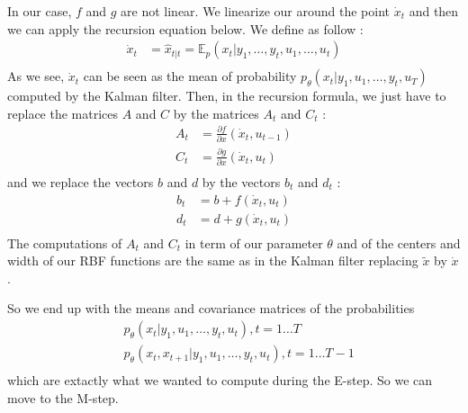 In our case, $f$ and $g$ are not linear.
We linearize our around the point $\dot{x}_t$ and then we can apply the recursion equation below.
We define  as follow :
\begin{align*}
  \dot{x}_t &= \hat{x}_{t|t} = \mathbb{E}_p(x_t|y_1, \ldots , y_t, u_1, \ldots , u_t) \\
\end{align*}
As we see, $\dot{x}_t$ can be seen as the mean of probability  $p_{\theta}\left(x_t|y_1, u_1, \ldots, y_t, u_T \right )$ computed by the Kalman filter.
Then, in the recursion formula, we just have to replace the matrices $A$ and $C$  by the matrices $A_t$ and $C_t$ :
\begin{align*}
  A_t &= \frac{\partial f}{\partial x}(\dot{x}_t, u_{t-1})\\
  C_t &= \frac{\partial g}{\partial x}(\dot{x}_t, u_t)\\
\end{align*}
and we replace the vectors $b$ and $d$ by the vectors $b_t$ and $d_t$ :
\begin{align*}
  b_t &= b + f(\dot{x}_t, u_t)\\
  d_t &= d + g(\dot{x}_t, u_t)\\
\end{align*}
The computations of $A_t$ and $C_t$ in term of our parameter $\theta$  and of the centers and width of our RBF functions are the same as in the Kalman filter replacing $\tilde{x}$ by $\dot{x}$.

So we end up with the means and covariance matrices of the probabilities
\begin{align*}
  &p_{\theta}\left(x_t|y_1, u_1, \ldots, y_t, u_t \right ), t=1 \ldots T\\
  &p_{\theta}\left(x_t, x_{t+1}|y_1, u_1, \ldots, y_t, u_t \right ), t=1 \ldots T-1\\
\end{align*}
which are extactly what we wanted to compute during the E-step.
So we can move to the M-step.
